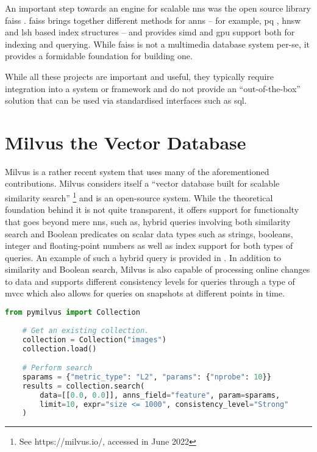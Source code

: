 An important step towards an engine for scalable \acrshort{nns} was the open source library \acrfull{faiss} \cite{Johnson:2019Billion}. \acrshort{faiss} brings together different methods for \acrshort{anns} -- for example, \acrshort{pq} \cite{Jegou:2010Product}, \acrshort{hnsw} \cite{Malkov:2018Efficient} and \acrshort{lsh} \cite{Indyk1998:Approximate} based index structures -- and provides  \acrshort{simd} and \acrshort{gpu} support both for indexing and querying. While \acrshort{faiss} is not a multimedia database system per-se, it provides a formidable foundation for building one.

While all these projects are important and useful, they typically require integration into a system or framework and do not provide an ``out-of-the-box'' solution that can be used via standardised interfaces such as \acrshort{sql}.

\section{Milvus the Vector Database}
Milvus \cite{Wang:2021Milvus} is a rather recent system that uses many of the aforementioned contributions. Milvus considers itself a ``vector database built for scalable similarity search'' \footnote{See https://milvus.io/, accessed in June 2022} and is an open-source system. While the theoretical foundation behind it is not quite transparent, it offers support for functionalty that goes beyond mere \acrshort{nns}, such as, hybrid queries involving both similarity search and Boolean predicates on scalar data types such as strings, booleans, integer and floating-point numbers as well as index support for both types of queries. An example of such a hybrid query is provided in . In addition to similarity and Boolean search, Milvus is also capable of processing online changes to data and supports different consistency levels for queries through a type of \acrshort{mvcc} which also allows for queries on snapshots at different points in time.

\begin{lstlisting}[language=Python, caption={Example of a hybrid query to Milvus in Python. The \texttt{expr} parameter can be used to specify Boolean filters. Source: https://milvus.io/}, label={listing:milvus_query}]
    from pymilvus import Collection
    
    # Get an existing collection.
    collection = Collection("images")      
    collection.load()

    # Perform search
    sparams = {"metric_type": "L2", "params": {"nprobe": 10}}
    results = collection.search(
        data=[[0.0, 0.0]], anns_field="feature", param=sparams, 
        limit=10, expr="size <= 1000", consistency_level="Strong"
    )
\end{lstlisting}

